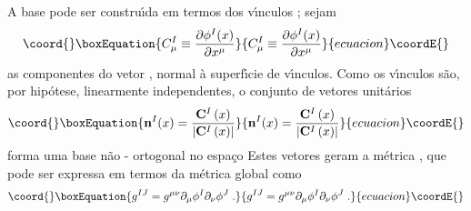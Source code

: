 \documentclass[a4paper,thmsa,12pt]{report}
\begin{document}
A base \coordHE{} pode ser constru\'{\i}da em termos dos
v\'{\i}nculos \coordHE{} ; sejam 
\begin{equation}\coord{}\boxEquation{
C_{\mu }^{I}\equiv \frac{\partial \phi ^{I}(x)}{\partial x^{\mu }}  \label{3}
}{
C_{\mu }^{I}\equiv \frac{\partial \phi ^{I}(x)}{\partial x^{\mu }}  }{ecuacion}\coordE{}\end{equation}
as componentes do vetor \coordHE{}, normal \`{a} superf\'{\i}cie de
v\'{\i}nculos. Como os v\'{\i}nculos s\~{a}o, por hip\'{o}tese, linearmente
independentes, o conjunto de vetores unit\'{a}rios 
\begin{equation}\coord{}\boxEquation{
\mathbf{n}^{I}(x)=\frac{\mathbf{C}^{I}\left( x\right) }{\left| \mathbf{C}
^{I}\left( x\right) \right| }  \label{4}
}{
\mathbf{n}^{I}(x)=\frac{\mathbf{C}^{I}\left( x\right) }{\left| \mathbf{C}
^{I}\left( x\right) \right| }  }{ecuacion}\coordE{}\end{equation}
forma uma base n\~{a}o - ortogonal no espa\c{c}o \coordHE{} Estes
vetores geram a m\'{e}trica \coordHE{}, que pode ser expressa em termos da
m\'{e}trica global \coordHE{} como 
\begin{equation}\coord{}\boxEquation{
g^{IJ}=g^{\mu \nu }\partial _{\mu }\phi ^{I}\partial _{\nu }\phi ^{J}\;.
\label{5}
}{
g^{IJ}=g^{\mu \nu }\partial _{\mu }\phi ^{I}\partial _{\nu }\phi ^{J}\;.
}{ecuacion}\coordE{}\end{equation}
\end{document}
